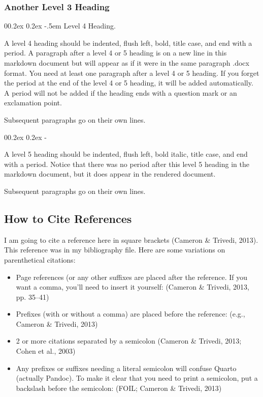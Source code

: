 \documentclass[
  floatsintext,
  man,
  colorlinks=true,linkcolor=blue,citecolor=blue,urlcolor=blue,biblatex]{apa7}
\makeatletter
\renewcommand{\paragraph}{\@startsection{paragraph}{4}{\parindent}%
	{0\baselineskip \@plus 0.2ex \@minus 0.2ex}%
	{-.5em}%
	{\normalfont\normalsize\bfseries\typesectitle}}
\renewcommand{\subparagraph}[1]{\@startsection{subparagraph}{5}{0.5em}%
	{0\baselineskip \@plus 0.2ex \@minus 0.2ex}%
	{-\z@\relax}%
	{\normalfont\normalsize\bfseries\itshape\hspace{\parindent}{#1}\textit{\addperi}}{\relax}}
\makeatother
\begin{document}
\hypertarget{another-level-3-heading}{%
\subsubsection{Another Level 3 Heading}\label{another-level-3-heading}}

\hypertarget{level-4-heading.}{%
\paragraph{Level 4 Heading.}\label{level-4-heading.}}

A level 4 heading should be indented, flush left, bold, title case, and
end with a period. A paragraph after a level 4 or 5 heading is on a new
line in this markdown document but will appear as if it were in the same
paragraph .docx format. You need at least one paragraph after a level 4
or 5 heading. If you forget the period at the end of the level 4 or 5
heading, it will be added automatically. A period will not be added if
the heading ends with a question mark or an exclamation point.

Subsequent paragraphs go on their own lines.

\hypertarget{level-5-heading}{%
\subparagraph{Level 5 Heading.}\label{level-5-heading}}

A level 5 heading should be indented, flush left, bold italic, title
case, and end with a period. Notice that there was no period after this
level 5 heading in the markdown document, but it does appear in the
rendered document.

Subsequent paragraphs go on their own lines.

\hypertarget{how-to-cite-references}{%
\subsection{How to Cite References}\label{how-to-cite-references}}

I am going to cite a reference here in square brackets (Cameron \&
Trivedi, 2013). This reference was in my bibliography file. Here are
some variations on parenthetical citations:

\begin{itemize}
\item
  Page references (or any other suffixes are placed after the reference.
  If you want a comma, you'll need to insert it yourself: (Cameron \&
  Trivedi, 2013, pp. 35--41)
\item
  Prefixes (with or without a comma) are placed before the reference:
  (e.g., Cameron \& Trivedi, 2013)
\item
  2 or more citations separated by a semicolon (Cameron \& Trivedi,
  2013; Cohen et al., 2003)
\item
  Any prefixes or suffixes needing a literal semicolon will confuse
  Quarto (actually Pandoc). To make it clear that you need to print a
  semicolon, put a backslash before the semicolon: (FOIL; Cameron \&
  Trivedi, 2013)
\end{itemize}
\end{document}

